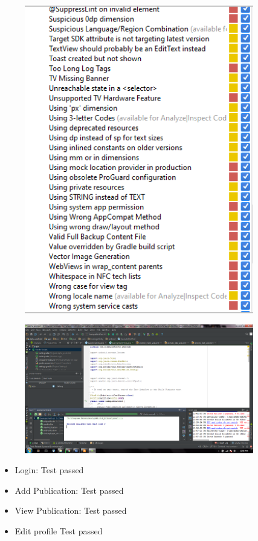 \begin{figure}[H]
  		\centering
      	\includegraphics[width=100mm]{Capture15}	      	
  		\caption{}
\end{figure}

\begin{figure}[H]
  		\centering
      	\includegraphics[width=100mm]{androidPic1}	      	
  		\caption{}
\end{figure}

\begin{itemize}
\item Login: Test passed  
\item Add Publication: Test passed
\item View Publication: Test passed
\item Edit profile Test passed
\end{itemize}




